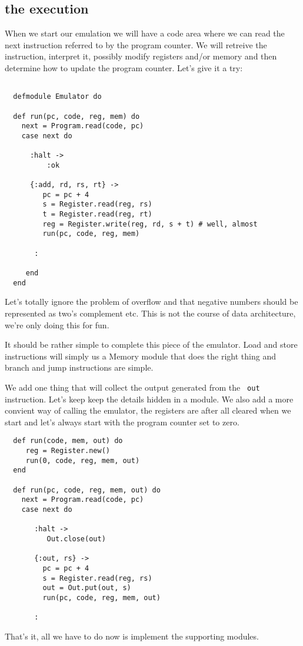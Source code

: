 \documentclass[a4paper,11pt]{article}
\begin{document}
\subsection{the execution}

When we start our emulation we will have a code area where we can read
the next instruction referred to by the program counter. We will
retreive the instruction, interpret it, possibly modify registers
and/or memory and then determine how to update the program
counter. Let's give it a try:

\begin{verbatim}

  defmodule Emulator do
  
  def run(pc, code, reg, mem) do
    next = Program.read(code, pc)
    case next do

      :halt ->  
          :ok

      {:add, rd, rs, rt} ->
         pc = pc + 4
         s = Register.read(reg, rs)
         t = Register.read(reg, rt)
         reg = Register.write(reg, rd, s + t) # well, almost
         run(pc, code, reg, mem)
      
       :

     end
  end
\end{verbatim}
   
Let's totally ignore the problem of overflow and that negative numbers
should be represented as two's complement etc. This is not the course
of data architecture, we're only doing this for fun.

It should be rather simple to complete this piece of the
emulator. Load and store instructions will simply us a Memory module
that does the right thing and branch and jump instructions are simple.


We add one thing that will collect the output generated from the {\tt
  out} instruction. Let's keep keep the details hidden in a module. We
also add a more convient way of calling the emulator, the registers
are after all cleared when we start and let's always start with the
program counter set to zero.


\begin{verbatim}
  def run(code, mem, out) do
     reg = Register.new() 
     run(0, code, reg, mem, out)
  end

  def run(pc, code, reg, mem, out) do
    next = Program.read(code, pc)
    case next do

       :halt ->
          Out.close(out)
    
       {:out, rs} ->
         pc = pc + 4
         s = Register.read(reg, rs)
         out = Out.put(out, s)
         run(pc, code, reg, mem, out)

       :
 \end{verbatim}

 That's it, all we have to do now is implement the supporting modules.

 
\end{document}
